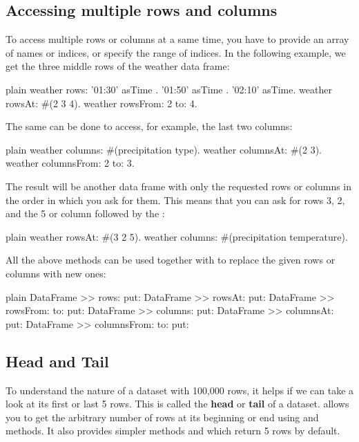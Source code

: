 \documentclass[10pt,twoside,english]{_support/latex/sbabook/sbabook}
\begin{document}
\subsection{Accessing multiple rows and columns}
To access multiple rows or columns at a same time, you have to provide an array of names or indices, or specify the range of indices. In the following example, we get the three middle rows of the weather data frame:

\begin{displaycode}{plain}
weather rows: { '01:30' asTime . '01:50' asTime . '02:10' asTime}.
weather rowsAt: #(2 3 4).
weather rowsFrom: 2 to: 4.
\end{displaycode}

The same can be done to access, for example, the last two columns:

\begin{displaycode}{plain}
weather columns: #(precipitation type).
weather columnsAt: #(2 3).
weather columnsFrom: 2 to: 3.
\end{displaycode}

The result will be another data frame with only the requested rows or columns in the order in which you ask for them. This means that you can ask for rows 3, 2, and the 5 or column  followed by the :

\begin{displaycode}{plain}
weather rowsAt: #(3 2 5).
weather columns: #(precipitation temperature).
\end{displaycode}

All the above methods can be used together with  to replace the given rows or columns with new ones:

\begin{displaycode}{plain}
DataFrame >> rows: put:
DataFrame >> rowsAt: put:
DataFrame >> rowsFrom: to: put:
DataFrame >> columns: put:
DataFrame >> columnsAt: put:
DataFrame >> columnsFrom: to: put:
\end{displaycode}
\subsection{Head and Tail}
To understand the nature of a dataset with 100,000 rows, it helps if we can take a look at its first or last 5 rows. This is called the \textbf{head} or \textbf{tail} of a dataset.  allows you to get the arbitrary number of rows at its beginning or end using  and  methods. It also provides simpler methods  and  which return 5 rows by default.
\end{document}
